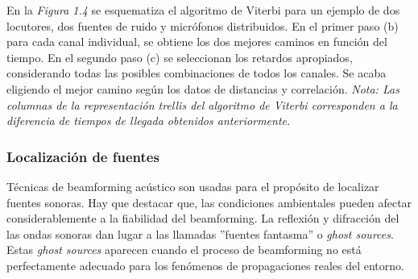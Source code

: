 \documentclass[a4paper,11pt]{book}
\begin{document}
			En la \textit{Figura 1.4} se esquematiza el algoritmo de Viterbi para un ejemplo de dos locutores, dos fuentes de ruido y micrófonos distribuidos. En el primer paso (b) para cada canal individual, se obtiene los dos mejores caminos en función del tiempo. En el segundo paso (c) se seleccionan los retardos apropiados, considerando todas las posibles combinaciones de todos los canales. Se acaba eligiendo el mejor camino según los datos de distancias y correlación.\linebreak 
			\textit{Nota: Las columnas de la representación trellis del algoritmo de Viterbi corresponden a la diferencia de tiempos de llegada obtenidos anteriormente.
}
			\subsubsection{Localización de fuentes}
			Técnicas de beamforming acústico son usadas para el propósito de localizar fuentes sonoras. Hay que destacar que, las condiciones ambientales pueden afectar considerablemente a la fiabilidad del beamforming. La reflexión y difracción del las ondas sonoras dan lugar a las llamadas ''fuentes fantasma'' o \textit{ghost sources}. Estas \textit{ghost sources} aparecen cuando el proceso de beamforming no está perfectamente adecuado para los fenómenos de propagaciones reales del entorno.
			
\end{document}
